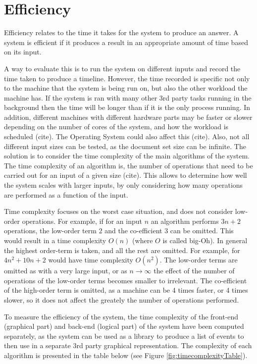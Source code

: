 \section{Efficiency}
\par Efficiency relates to the time it takes for the system to produce an answer. A system is efficient if it produces a result in an appropriate amount of time based on its input.
\par A way to evaluate this is to run the system on different inputs and record the time taken to produce a timeline. However, the time recorded is specific not only to the machine that the system is being run on, but also the other workload the machine has. If the system is ran with many other 3rd party tasks running in the background then the time will be longer than if it is the only process running. In addition, different machines with different hardware parts may be faster or slower depending on the number of cores of the system, and how the workload is scheduled (cite). The Operating System could also affect this (cite). Also, not all different input sizes can be tested, as the document set size can be infinite. The solution is to consider the time complexity of the main algorithms of the system. The time complexity of an algorithm is, the number of operations that need to be carried out for an input of a given size (cite). This allows to determine how well the system scales with larger inputs, by only considering how many operations are performed as a function of the input.
\par Time complexity focuses on the worst case situation, and does not consider low-order operations. For example, if for an input $n$ an algorithm performs $3n+2$ operations, the low-order term $2$ and the co-efficient $3$ can be omitted. This would result in a time complexity $O(n)$ (where $O$ is called big-Oh). In general the highest order-term is taken, and all the rest are omitted. For example, for $4n^2+10n+2$ would have time complexity $O(n^2)$.  The low-order terms are omitted as with a very large input, or as ${n\to\infty}$ the effect of the number of operations of the low-order terms becomes smaller to irrelevant. The co-efficient of the high-order term is omitted, as a machine can be 4 times faster, or 4 times slower, so it does not affect the greately the number of operations performed.
\par To measure the efficiency of the system, the time complexity of the front-end (graphical part) and back-end (logical part) of the system have been computed separately, as the system can be used as a library to produce a list of events to then use in a separate 3rd party graphical representation. The complexity of each algorithm is presented in the table below (see Figure \ref{fig:timecomplexityTable}).

